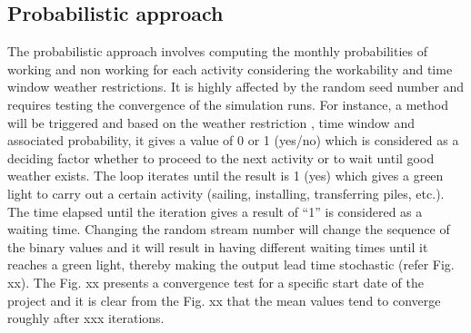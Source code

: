 \subsection{Probabilistic approach}
The probabilistic approach involves computing the monthly probabilities of working and non working for each activity considering the workability and time window weather restrictions. It is highly affected by the random seed number and requires testing the convergence of the simulation runs. 
For instance, a method will be triggered and based on the weather restriction , time window and associated probability, it gives a value of 0 or 1 (yes/no) which is considered as a deciding factor whether to proceed to the next activity or to wait until good weather exists. The loop iterates until the result is 1 (yes) which gives a green light to carry out a certain activity (sailing, installing, transferring piles, etc.). The time elapsed until the iteration gives a result of “1” is considered as a waiting time. Changing the random stream number will change the sequence of the binary values and it will result in having different waiting times until it reaches a green light, thereby making the output lead time stochastic (refer Fig. xx). The Fig. xx presents a convergence test for a specific start date of the project and it is clear from the Fig. xx that the mean values tend to converge roughly after xxx iterations.